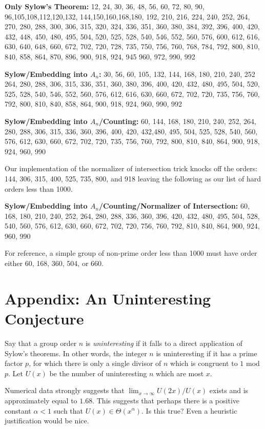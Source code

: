\documentclass[11pt,
oneside]{article} %
\begin{document}
\textbf{Only Sylow's Theorem:} 12, 24, 30, 36, 48, 56, 60, 72,
80, 90, 96,105,108,112,120,132,
144,150,160,168,180, 192, 210, 216,
224, 240, 252, 264, 270, 280, 288, 300,
306, 315, 320, 324, 336, 351, 360, 380,
384, 392, 396, 400, 420, 432, 448, 450, 480, 495, 504, 520, 525, 528,
540, 546, 552, 560, 576, 600, 612, 616, 630,
640, 648, 660, 672, 702, 720, 728, 735, 750, 756, 760, 768,
784, 792, 800, 810, 840, 858, 864, 870, 896, 900, 918, 924, 945
960, 972, 990, 992
\newline

\textbf{Sylow/Embedding into $A_n$:}
30, 56, 60, 105, 132, 144, 168, 180, 210, 240, 252 264, 280, 288, 306, 315, 336, 351, 360, 380, 396,
400, 420, 432, 480, 495, 504, 520, 525, 528, 540, 546,
552, 560, 576, 612, 616, 630, 660, 672,
702, 720, 735, 756, 760, 792, 800, 810, 840, 858, 864, 900, 918, 924, 960, 990, 992
\newline

\textbf{Sylow/Embedding into $A_n$/Counting:} 60,
144, 168, 180, 210, 240, 252, 264, 280, 288, 306, 315, 336, 360, 396,
400, 420, 432,480, 495, 504, 525, 528, 540, 560, 576,
612, 630, 660, 672, 702, 720, 735, 756, 760, 792, 800, 810,
840, 864, 900, 918, 924, 960, 990
\newline

Our implementation of the normalizer of intersection trick knocks off the orders: 144, 306, 315, 400, 525, 735, 800, and 918 leaving the following as our list of hard orders less than 1000.
\newline

\textbf{Sylow/Embedding into $A_n$/Counting/Normalizer of Intersection:}
60, 168, 180, 210, 240, 252, 264, 280, 288, 336, 360, 396, 420, 432, 480, 495, 504, 528, 540, 560, 576, 612, 630, 660, 672, 702, 720, 756, 760, 792, 810, 
840, 864, 900, 924, 960, 990
\newline

For reference, a simple group of non-prime order less than 1000 must have order either 60, 168, 360, 504, or 660.

\section{Appendix: An Uninteresting Conjecture}
Say that a group order $n$ is \textit{uninteresting} if it falls to a
direct application of Sylow's theorems.  In other words, the integer
$n$ is uninteresting if it has a prime factor $p$, for which there is
only a single divisor of $n$ which is congruent to $1$ mod $p$.  Let
$U(x)$ be the number of uninteresting $n$ which are most $x$.

Numerical data strongly suggests that
$\lim_{x\rightarrow \infty} U(2x)/U(x)$ exists and is approximately
equal to $1.68$.  This suggests that perhaps there is a positive
constant $\alpha < 1$ such that $U(x) \in \Theta(x^{\alpha}).$ Is this
true?  Even a heuristic justification would be nice.
\end{document}
